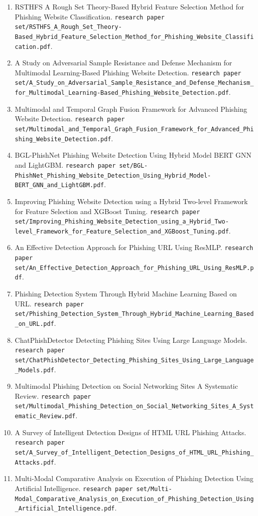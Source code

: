 \documentclass[conference]{IEEEtran}
\begin{document}
\begin{enumerate}
    \item RSTHFS A Rough Set Theory-Based Hybrid Feature Selection Method for Phishing Website Classification. \texttt{research paper set/RSTHFS_A_Rough_Set_Theory-Based_Hybrid_Feature_Selection_Method_for_Phishing_Website_Classification.pdf}.
    \item A Study on Adversarial Sample Resistance and Defense Mechanism for Multimodal Learning-Based Phishing Website Detection. \texttt{research paper set/A_Study_on_Adversarial_Sample_Resistance_and_Defense_Mechanism_for_Multimodal_Learning-Based_Phishing_Website_Detection.pdf}.
    \item Multimodal and Temporal Graph Fusion Framework for Advanced Phishing Website Detection. \texttt{research paper set/Multimodal_and_Temporal_Graph_Fusion_Framework_for_Advanced_Phishing_Website_Detection.pdf}.
    \item BGL-PhishNet Phishing Website Detection Using Hybrid Model BERT GNN and LightGBM. \texttt{research paper set/BGL-PhishNet_Phishing_Website_Detection_Using_Hybrid_Model-BERT_GNN_and_LightGBM.pdf}.
    \item Improving Phishing Website Detection using a Hybrid Two-level Framework for Feature Selection and XGBoost Tuning. \texttt{research paper set/Improving_Phishing_Website_Detection_using_a_Hybrid_Two-level_Framework_for_Feature_Selection_and_XGBoost_Tuning.pdf}.
    \item An Effective Detection Approach for Phishing URL Using ResMLP. \texttt{research paper set/An_Effective_Detection_Approach_for_Phishing_URL_Using_ResMLP.pdf}.
    \item Phishing Detection System Through Hybrid Machine Learning Based on URL. \texttt{research paper set/Phishing_Detection_System_Through_Hybrid_Machine_Learning_Based_on_URL.pdf}.
    \item ChatPhishDetector Detecting Phishing Sites Using Large Language Models. \texttt{research paper set/ChatPhishDetector_Detecting_Phishing_Sites_Using_Large_Language_Models.pdf}.
    \item Multimodal Phishing Detection on Social Networking Sites A Systematic Review. \texttt{research paper set/Multimodal_Phishing_Detection_on_Social_Networking_Sites_A_Systematic_Review.pdf}.
    \item A Survey of Intelligent Detection Designs of HTML URL Phishing Attacks. \texttt{research paper set/A_Survey_of_Intelligent_Detection_Designs_of_HTML_URL_Phishing_Attacks.pdf}.
    \item Multi-Modal Comparative Analysis on Execution of Phishing Detection Using Artificial Intelligence. \texttt{research paper set/Multi-Modal_Comparative_Analysis_on_Execution_of_Phishing_Detection_Using_Artificial_Intelligence.pdf}.
\end{enumerate}
\end{document}
